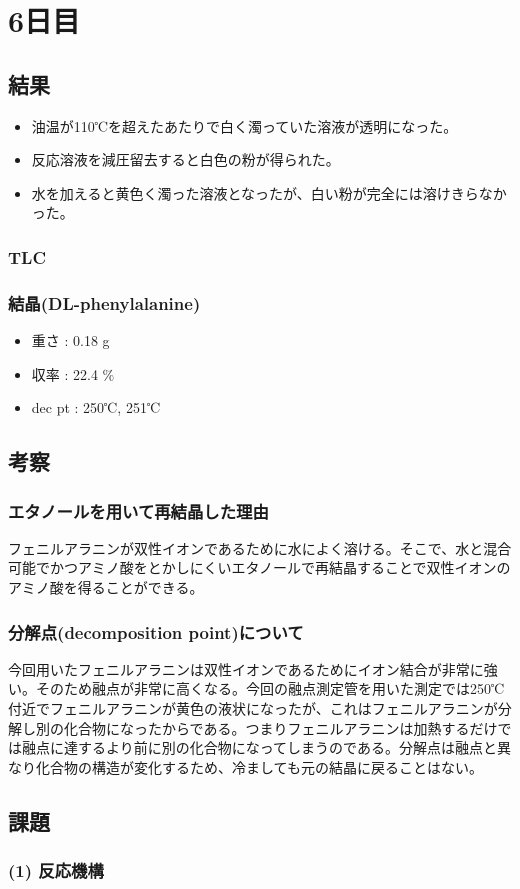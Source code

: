 


\section*{6日目}

\subsection*{結果}
\begin{itemize}
\item 油温が110℃を超えたあたりで白く濁っていた溶液が透明になった。
\item 反応溶液を減圧留去すると白色の粉が得られた。
\item 水を加えると黄色く濁った溶液となったが、白い粉が完全には溶けきらなかった。

\end{itemize}
\subsubsection*{TLC}

\subsubsection*{結晶(DL-phenylalanine)}
\begin{itemize}
\item 重さ : 0.18 g
\item 収率 : 22.4 $\%$
\item dec pt : 250℃, 251℃

\end{itemize}
\subsection*{考察}
\subsubsection*{エタノールを用いて再結晶した理由}
フェニルアラニンが双性イオンであるために水によく溶ける。そこで、水と混合可能でかつアミノ酸をとかしにくいエタノールで再結晶することで双性イオンのアミノ酸を得ることができる。

\subsubsection*{分解点(decomposition point)について}
今回用いたフェニルアラニンは双性イオンであるためにイオン結合が非常に強い。そのため融点が非常に高くなる。今回の融点測定管を用いた測定では250℃付近でフェニルアラニンが黄色の液状になったが、これはフェニルアラニンが分解し別の化合物になったからである。つまりフェニルアラニンは加熱するだけでは融点に達するより前に別の化合物になってしまうのである。分解点は融点と異なり化合物の構造が変化するため、冷ましても元の結晶に戻ることはない。

\subsection*{課題}

\subsubsection*{(1) 反応機構}

